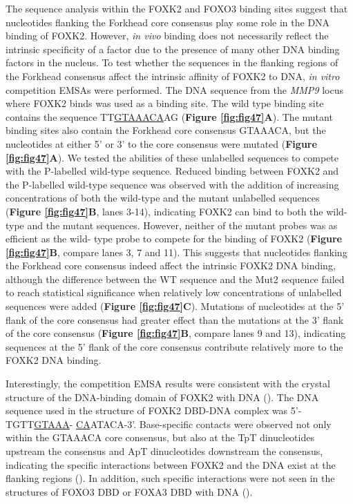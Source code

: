 The sequence analysis within the FOXK2 and FOXO3 binding sites suggest that nucleotides flanking the Forkhead core consensus play some role in the DNA binding of FOXK2. However, \textit{in vivo} binding does not necessarily reflect the intrinsic specificity of a factor due to the presence of many other DNA binding factors in the nucleus. To test whether the sequences in the flanking regions of the Forkhead consensus affect the intrinsic affinity of FOXK2 to DNA, \textit{in vitro} competition EMSAs were performed. The DNA sequence from the \textit{MMP9} locus where FOXK2 binds was used as a binding site. The wild type binding site contains the sequence TT\underline{GTAAACA}AG (\textbf{Figure \ref{fig:fig47}A}). The mutant binding sites also contain the Forkhead core consensus GTAAACA, but the nucleotides at either 5' or 3' to the core consensus were mutated (\textbf{Figure \ref{fig:fig47}A}). We tested the abilities of these unlabelled sequences to compete with the P-labelled wild-type sequence. Reduced binding between FOXK2 and the P-labelled wild-type sequence was observed with the addition of increasing concentrations of both the wild-type and the mutant unlabelled sequences (\textbf{Figure \ref{fig:fig47}B}, lanes 3-14), indicating FOXK2 can bind to both the wild-type and the mutant sequences. However, neither of the mutant probes was as efficient as the wild- type probe to compete for the binding of FOXK2 (\textbf{Figure \ref{fig:fig47}B}, compare lanes 3, 7 and 11). This suggests that nucleotides flanking the Forkhead core consensus indeed affect the intrinsic FOXK2 DNA binding, although the difference between the WT sequence and the Mut2 sequence failed to reach statistical significance when relatively low concentrations of unlabelled sequences were added (\textbf{Figure \ref{fig:fig47}C}). Mutations of nucleotides at the 5' flank of the core consensus had greater effect than the mutations at the 3' flank of the core consensus (\textbf{Figure \ref{fig:fig47}B}, compare lanes 9 and 13), indicating sequences at the 5' flank of the core consensus contribute relatively more to the FOXK2 DNA binding.

Interestingly, the competition EMSA results were consistent with the crystal structure of the DNA-binding domain of FOXK2 with DNA (\cite{tsai2006crystal}). The DNA sequence used in the structure of FOXK2 DBD-DNA complex was 5'-TGTT\underline{GTAAA}- \underline{CA}ATACA-3'. Base-specific contacts were observed not only within the GTAAACA core consensus, but also at the TpT dinucleotides upstream the consensus and ApT dinucleotides downstream the consensus, indicating the specific interactions between FOXK2 and the DNA exist at the flanking regions (\cite{tsai2006crystal}). In addition, such specific interactions were not seen in the structures of FOXO3 DBD or FOXA3 DBD with DNA (\cite{tsai2006crystal,clark1993co-crystal}).


